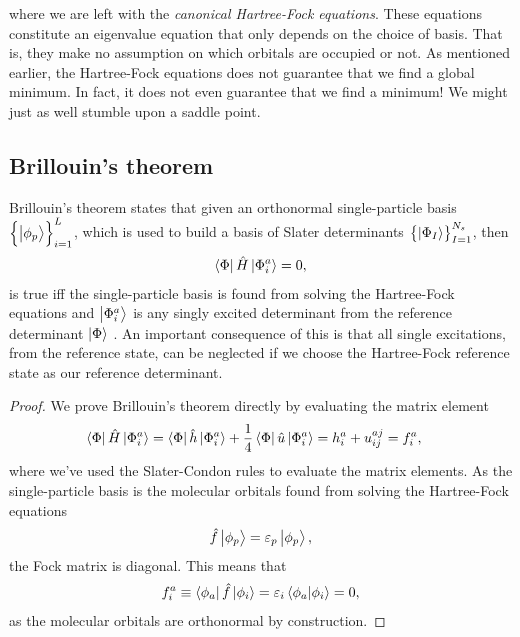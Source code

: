             where we are left with the \emph{canonical Hartree-Fock equations}.
            These equations constitute an eigenvalue equation that only depends on
            the choice of basis.
            That is, they make no assumption on which orbitals are occupied or not.
            As mentioned earlier, the Hartree-Fock equations does not guarantee that
            we find a global minimum.
            In fact, it does not even guarantee that we find a minimum!
            We might just as well stumble upon a saddle point.

        \subsection{Brillouin's theorem}
            Brillouin's theorem states that given an orthonormal single-particle
            basis $\left\{ \ket{\phi_p} \right\}_{i = 1}^{L}$, which is used to build a basis of
            Slater determinants $\left\{ \ket{\Phi_I} \right\}_{I = 1}^{N_s}$, then
            \begin{align}
                \bra{\Phi}\hat{H}\ket{\Phi^{a}_{i}} = 0,
            \end{align}
            is true iff the single-particle basis is found from solving the
            Hartree-Fock equations and $\ket{\Phi^{a}_{i}}$ is any singly
            excited determinant from the reference determinant $\ket{\Phi}$
            \cite{kvaal2017notes}.
            An important consequence of this is that all single excitations,
            from the reference state, can be neglected if we choose the
            Hartree-Fock reference state as our reference determinant.
            \begin{proof}
                We prove Brillouin's theorem directly by evaluating the matrix
                element
                \begin{align}
                    \bra{\Phi}\hat{H}\ket{\Phi^{a}_{i}}
                    &= \bra{\Phi}\hat{h}\ket{\Phi^{a}_{i}}
                    + \frac{1}{4}\bra{\Phi}\hat{u}\ket{\Phi^{a}_{i}}
                    = h^{a}_{i} + u^{aj}_{ij}
                    = f^{a}_{i},
                \end{align}
                where we've used the Slater-Condon rules to evaluate the matrix
                elements.
                As the single-particle basis is the molecular orbitals found
                from solving the Hartree-Fock equations
                \begin{align}
                    \hat{f}\ket{\phi_p} = \varepsilon_p\ket{\phi_p},
                \end{align}
                the Fock matrix is diagonal.
                This means that
                \begin{align}
                    f^{a}_{i}
                    \equiv
                    \bra{\phi_a}\hat{f}\ket{\phi_i}
                    = \varepsilon_i\braket{\phi_a}{\phi_i}
                    = 0,
                \end{align}
                as the molecular orbitals are orthonormal by construction.
            \end{proof}

